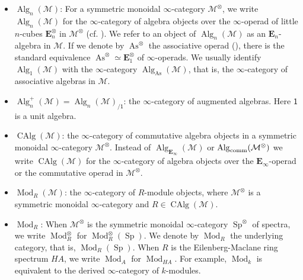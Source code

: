 \documentclass[leqno,12pt]{amsart}
\theoremstyle{plain}
\theoremstyle{definition}
\newcommand{\NNNN}{\operatorname{N}}
\newcommand{\MMM}{\mathcal{M}}
\newcommand{\SP}{\operatorname{Sp}}
\newcommand{\Mod}{\operatorname{Mod}}
\newcommand{\Alg}{\operatorname{Alg}}
\newcommand{\FIN}{\operatorname{Fin}_\ast}
\newcommand{\CAlg}{\operatorname{CAlg}}
\newcommand{\assoc}{\operatorname{As}}
\newcommand{\eone}{\mathbf{E}_1}
\newcommand{\eenu}{\mathbf{E}_n}
\newcommand{\einf}{\mathbf{E}_\infty}
\begin{document}
\begin{itemize}
\label{notation2}





\item $\Alg_n(\MMM)$:
For a symmetric monoidal $\infty$-category $\MMM^\otimes$,
we write $\Alg_{n}(\MMM)$ for
the $\infty$-category of algebra objects over the $\infty$-operad of little $n$-cubes $\mathbf{E}^\otimes_n$ in $\MMM^\otimes$  (cf. \cite[5.1]{HA}).
We refer to an object of $\Alg_{n}(\MMM)$ as an $\eenu$-algebra in $\MMM$.
If we denote by $\assoc^\otimes$ the associative operad (\cite[4.1.1]{HA}),
there is the standard equivalence $\assoc^\otimes\simeq \eone^\otimes$
of $\infty$-operads. We usually identify $\Alg_{1}(\MMM)$
with the $\infty$-category $\Alg_{\assoc}(\MMM)$, that is, the 
$\infty$-category of associative algebras in $\MMM$.

\item $\Alg_n^+(\MMM)=\Alg_n(\MMM)_{/\mathsf{1}}$: the $\infty$-category of augmented algebras. Here $\mathsf{1}$ is a unit algebra.




\item $\CAlg(\mathcal{M})$: the $\infty$-category of commutative
algebra objects in a symmetric
monoidal $\infty$-category $\mathcal{M}^\otimes$.
Instead of $\Alg_{\einf}(\MMM)$ or $\Alg_{\textup{comm}}(\MMM^\otimes)$
we write $\CAlg(\mathcal{M})$ for the $\infty$-category of algebra objects over the $\einf$-operad or the commutative operad in $\MMM^\otimes$. 





\item $\Mod_R(\mathcal{M})$: 
the $\infty$-category of
$R$-module objects,
where $\mathcal{M}^\otimes$
is a symmetric monoidal $\infty$-category and $R\in \CAlg(\MMM)$.

\item $\Mod_R$: When $\MMM^\otimes$ is the symmetric monoidal $\infty$-category $\SP^\otimes$
of spectra, 
we write $\Mod_R^\otimes$
for
$\Mod_R^\otimes(\SP)$.
We denote by $\Mod_R$ the underlying category, that is, $\Mod_R(\SP)$.
When $R$ is the Eilenberg-Maclane ring spectrum $HA$, we write $\Mod_A$ for $\Mod_{HA}$.
For example, $\Mod_k$ is equivalent to the derived $\infty$-category of $k$-modules.


\end{itemize}
\end{document}
